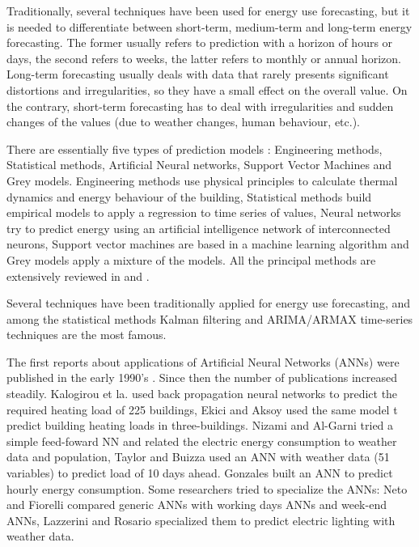\documentclass{sig-alternate-sigmod07}
\begin{document}
Traditionally, several techniques have been used for energy use forecasting, but it is needed to differentiate between short-term, medium-term and long-term energy forecasting. The former usually refers to prediction with a horizon of hours or days, the second refers to weeks, the latter refers to monthly or annual horizon. Long-term forecasting usually deals with data that rarely presents significant distortions and irregularities, so they have a small effect on the overall value. On the contrary, short-term forecasting has to deal with irregularities and sudden changes of the values (due to weather changes, human behaviour, etc.). 

There are essentially five types of prediction models \cite{zhao2012review}: Engineering methods, Statistical methods, Artificial Neural networks, Support Vector Machines and Grey models. Engineering methods use physical principles to calculate thermal dynamics and energy behaviour of the building, Statistical methods build empirical models to apply a regression to time series of values, Neural networks try to predict energy using an artificial intelligence network of interconnected neurons, Support vector machines are based in a machine learning algorithm and Grey models apply a mixture of the models. All the principal methods are extensively reviewed in \cite{zhao2012review} and \cite{hippert2001neural}. 

Several techniques have been traditionally applied for energy use forecasting, and among the statistical methods Kalman filtering and ARIMA/ARMAX time-series techniques are the most famous. 

The first reports about applications of Artificial Neural Networks (ANNs) were published in the early 1990's \cite{czernichow1996short}. Since then the number of publications increased steadily. Kalogirou et la. \cite{kalogirou2006artificial} used back propagation neural networks to predict the required heating load of 225 buildings, Ekici and Aksoy used the same model t predict building heating loads in three-buildings. Nizami and Al-Garni \cite{JaveedNizami19951097} tried a simple feed-foward NN and related the electric energy consumption to weather data and population, Taylor and Buizza \cite{taylor2002neural} used an ANN with weather data (51 variables) to predict load of 10 days ahead. Gonzales \cite{gonzalez2005prediction} built an ANN to predict hourly energy consumption.
Some researchers tried to specialize the ANNs: Neto and Fiorelli \cite{neto2008comparison} compared generic ANNs with working days ANNs and week-end ANNs, Lazzerini and Rosario \cite{d2012neural} specialized them to predict electric lighting with weather data. 
\end{document}
